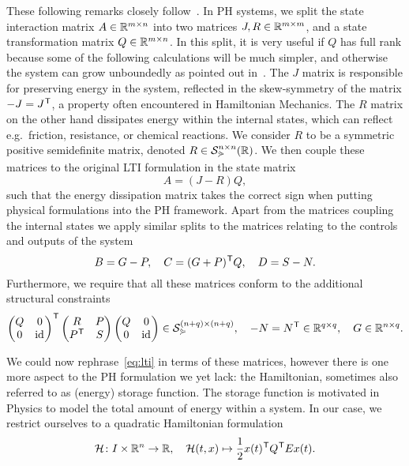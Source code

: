 These following remarks closely follow~\cite[Definition~4.9]{Mehrmann2022}.
In \ac{PH} systems, we split the state interaction matrix $A \in \mathbb{R}^{m \times n}$ into two matrices $J, R \in \mathbb{R}^{m \times m}$, and a state transformation matrix $Q \in \mathbb{R}^{m \times n}$.
In this split, it is very useful if $Q$ has full rank because some of the following calculations will be much simpler, and otherwise the system can grow unboundedly as pointed out in~\cite[Remark~4.10]{Mehrmann2022}.
The $J$ matrix is responsible for preserving energy in the system, reflected in the skew-symmetry of the matrix $-J = J^{\mkern1mu \mathsf{T}}$, a property often encountered in Hamiltonian Mechanics.
The $R$ matrix on the other hand dissipates energy within the internal states, which can reflect e.g.\ friction, resistance, or chemical reactions.
We consider $R$ to be a symmetric positive semidefinite matrix, denoted $R \in \mathcal{S}_{\curlyeqsucc}^{n \times n}(\mathbb{R})$.
We then couple these matrices to the original \ac{LTI} formulation in the state matrix
\begin{equation*}
    A = (J - R)Q,
\end{equation*}
such that the energy dissipation matrix takes the correct sign when putting physical formulations into the \ac{PH} framework.
Apart from the matrices coupling the internal states we apply similar splits to the matrices relating to the controls and outputs of the system
\begin{equation*}
    B = G - P,\quad C = (G + P)^{\mkern1mu \mathsf{T}} Q,\quad D = S - N.
\end{equation*}
Furthermore, we require that all these matrices conform to the additional structural constraints
\begin{equation*}
    \begin{pmatrix}
        Q & 0 \\
        0 & \text{id}_{}
    \end{pmatrix}^{\mkern1mu \mathsf{T}}
    \begin{pmatrix}
        R & P \\
        P^{\mkern1mu \mathsf{T}} & S
    \end{pmatrix}
    \begin{pmatrix}
        Q & 0 \\
        0 & \text{id}_{}
    \end{pmatrix}
    \in \mathcal{S}_{\curlyeqsucc}^{(n + q) \times (n + q)},\quad -N = N^{\mkern1mu \mathsf{T}} \in \mathbb{R}^{q \times q},\quad G \in \mathbb{R}^{n \times q}.
\end{equation*}

We could now rephrase~\eqref{eq:lti} in terms of these matrices, however there is one more aspect to the \ac{PH} formulation we yet lack: the Hamiltonian, sometimes also referred to as (energy) storage function.
The storage function is motivated in Physics to model the total amount of energy within a system.
In our case, we restrict ourselves to a quadratic Hamiltonian formulation
\begin{equation}\label{eq:quadratic-hamiltonian}
    \mathcal{H} \colon I \times \mathbb{R}^{n} \to \mathbb{R},\quad \mathcal{H}(t, x) \mapsto \frac{1}{2} x(t)^{\mkern1mu \mathsf{T}} Q^{\mkern1mu \mathsf{T}} E x(t).
\end{equation}

